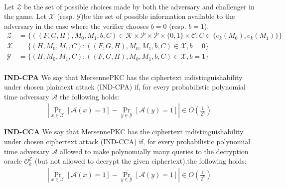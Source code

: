 \paragraph{}
Let $\mathcal{Z}$ be the set of possible choices made by both the adversary and challenger in the game. Let $\mathcal{X}$ (resp. $\mathcal{Y}$)be the set of possible information available to the adversary in the case where the verifier chooses $b = 0$ (resp. $b = 1$).
\begin{align*}
\mathcal{Z} &= \{ ((F, G, H), M_0, M_1, b, C) \in \mathcal{K} \times \mathcal{P} \times \mathcal{P} \times \{0,1\} \times \mathcal{C} : C \in \{e_k(M_0), e_k(M_1)\} \}\\
\mathcal{X} &= \{ (H, M_0, M_1, C) : ((F, G, H), M_0, M_1, b, C) \in \mathcal{X}, b = 0\}\\
\mathcal{Y} &= \{ (H, M_0, M_1, C) : ((F, G, H), M_0, M_1, b, C) \in \mathcal{X}, b = 1\}\\
\end{align*}

\theoremstyle{definition}
\begin{definition}{\textbf{IND-CPA}}
We say that MersennePKC has the ciphertext indistinguishability under chosen plaintext attack (IND-CPA) if, for every probabilistic polynomial time adversary $\mathcal{A}$ the following holds:
\begin{align*}
    |\Pr_{x \in \mathcal{X}}[\mathcal{A}(x) = 1] - \Pr_{y \in \mathcal{Y}}[\mathcal{A}(y) = 1]| \in O(\frac{1}{2^h})
\end{align*}
\end{definition}

\theoremstyle{definition}
\begin{definition}{\textbf{IND-CCA}}
We say that MersennePKC has the ciphertext indistinguishability under chosen ciphertext attack (IND-CCA) if, for every probabilistic polynomial time adversary $\mathcal{A}$ allowed to make polynomially many queries to the decryption oracle $\mathcal{O}_k^\mathcal{E}$ (but not allowed to decrypt the given ciphertext),the following holds:
\begin{align*}
    |\Pr_{x \in \mathcal{X}}[\mathcal{A}(x) = 1] - \Pr_{y \in \mathcal{Y}}[\mathcal{A}(y) = 1]| \in O(\frac{1}{2^h})
\end{align*}
\end{definition}

